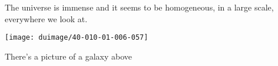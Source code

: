 \documentclass{article}
\begin{document}
The universe is immense and it seems to be homogeneous, 
in a large scale, everywhere we look at.
 
\texttt{[image: duimage/40-010-01-006-057]}
 
There's a picture of a galaxy above
\end{document}
